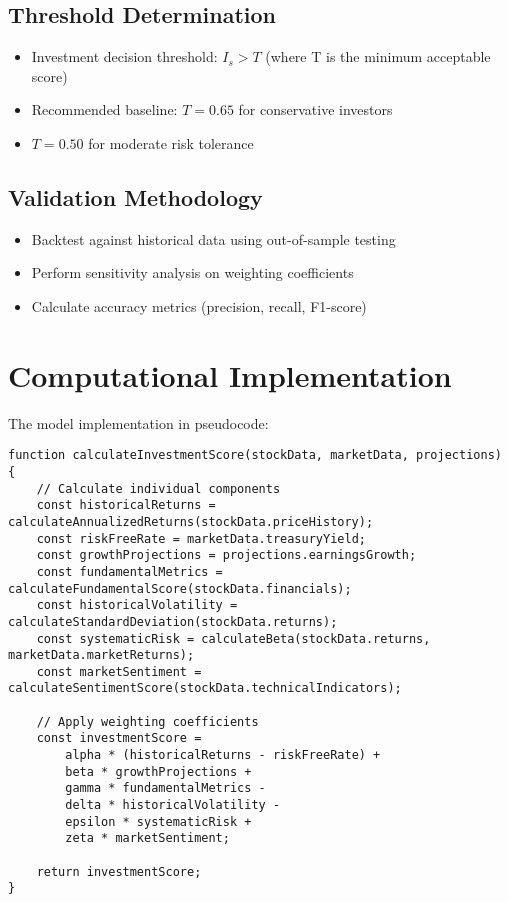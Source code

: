 \documentclass[12pt,a4paper]{article}
\begin{document}
\subsection{Threshold Determination}
\begin{itemize}
    \item Investment decision threshold: $I_s > T$ (where T is the minimum acceptable score)
    \item Recommended baseline: $T = 0.65$ for conservative investors
    \item $T = 0.50$ for moderate risk tolerance
\end{itemize}

\subsection{Validation Methodology}
\begin{itemize}
    \item Backtest against historical data using out-of-sample testing
    \item Perform sensitivity analysis on weighting coefficients
    \item Calculate accuracy metrics (precision, recall, F1-score)
\end{itemize}

\section{Computational Implementation}
The model implementation in pseudocode:

\begin{verbatim}
function calculateInvestmentScore(stockData, marketData, projections) {
    // Calculate individual components
    const historicalReturns = calculateAnnualizedReturns(stockData.priceHistory);
    const riskFreeRate = marketData.treasuryYield;
    const growthProjections = projections.earningsGrowth;
    const fundamentalMetrics = calculateFundamentalScore(stockData.financials);
    const historicalVolatility = calculateStandardDeviation(stockData.returns);
    const systematicRisk = calculateBeta(stockData.returns, marketData.marketReturns);
    const marketSentiment = calculateSentimentScore(stockData.technicalIndicators);
    
    // Apply weighting coefficients
    const investmentScore = 
        alpha * (historicalReturns - riskFreeRate) +
        beta * growthProjections +
        gamma * fundamentalMetrics -
        delta * historicalVolatility -
        epsilon * systematicRisk +
        zeta * marketSentiment;
    
    return investmentScore;
}
\end{verbatim}
\end{document}
